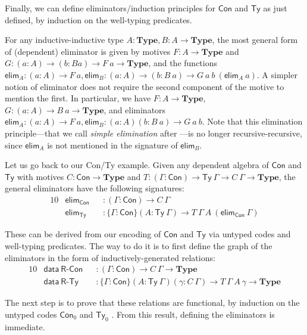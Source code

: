 \documentclass[autoref]{llncs}
\newcommand{\GG}{\Gamma}
\newcommand{\mType}{\mathbf{Type}}
\begin{document}
Finally, we can define eliminators/induction principles for $\textsf{Con}$ and
$\textsf{Ty}$ as just defined, by induction on the well-typing predicates.

For any inductive-inductive type $A : \mType, B: A \to \mType$, the most general
form of (dependent) eliminator is given by motives $F : A \to \mType$ and $G :
(a : A) \to (b : B a) \to F\ a \to \mType$, and the functions $\textsf{elim}_A :
(a : A) \to F\ a, \textsf{elim}_B : (a : A) \to (b : B\ a) \to
G\ a\ b\ (\textsf{elim}_A\ a)$. A simpler notion of eliminator does not require
the second component of the motive to mention the first. In particular, we have
$F : A \to \mType$, $G : (a : A) \to B\ a \to \mType$, and eliminators
$\textsf{elim}_A : (a : A) \to F\ a, \textsf{elim}_B : (a : A) (b : B\ a) \to
G\ a\ b$. Note that this elimination principle---that we call \emph{simple
  elimination} after \cite{ii}---is no longer recursive-recursive, since
$\textsf{elim}_A$ is not mentioned in the signature of $\textsf{elim}_B$.

Let us go back to our \textsf{Con}/\textsf{Ty} example. Given any dependent
algebra of $\textsf{Con}$ and $\textsf{Ty}$ with motives $C : \textsf{Con} \to
\mType$ and $T : (\GG : \textsf{Con}) \to \textsf{Ty}\ \GG \to C\ \GG \to
\mType$, the general eliminators have the following signatures:
\begin{alignat*}{10}
  & \textsf{elim}_{\textsf{Con}} && : (\GG : \textsf{Con}) \to C\ \GG \hspace{5em} \\
  & \textsf{elim}_{\textsf{Ty}} && : \{\GG : \textsf{Con}\} (A : \textsf{Ty}\ \GG) \to T\ \GG\ A\ (\textsf{elim}_{\textsf{Con}}\ \GG)
\end{alignat*}

These can be derived from our encoding of $\textsf{Con}$ and $\textsf{Ty}$ via
untyped codes and well-typing predicates. The way to do it is to first define
the graph of the eliminators in the form of inductively-generated relations:
\begin{alignat*}{10}
  & \textsf{data}\ \textsf{R-Con} && :
    (\GG : \textsf{Con}) \to C\ \GG \to \mType \\
  & \textsf{data}\ \textsf{R-Ty} && : \{\GG : \textsf{Con}\} (A : \textsf{Ty}\ \GG)
  (\gamma : C\ \GG)
  \to T\ \GG\ A\ \gamma
  \to \mType
\end{alignat*}

The next step is to prove that these relations are functional, by induction on
the untyped codes $\textsf{Con}_0$ and $\textsf{Ty}_0$ \cite{induction-is-enough}. From this result,
defining the eliminators is immediate.
\end{document}
